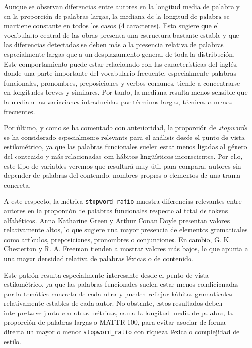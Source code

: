 \documentclass[IB]{TFUOC}%
\begin{document}
Aunque se observan diferencias entre autores en la longitud media de palabra y en la proporción de palabras largas, la mediana de la longitud de palabra se mantiene constante en todos los casos (4 caracteres). Esto sugiere que el vocabulario central de las obras presenta una estructura bastante estable y que las diferencias detectadas se deben más a la presencia relativa de palabras especialmente largas que a un desplazamiento general de toda la distribución. Este comportamiento puede estar relacionado con las características del inglés, donde una parte importante del vocabulario frecuente, especialmente palabras funcionales, pronombres, preposiciones y verbos comunes, tiende a concentrarse en longitudes breves y similares. Por tanto, la mediana resulta menos sensible que la media a las variaciones introducidas por términos largos, técnicos o menos frecuentes.

Por último, y como se ha comentado con anterioridad, la proporción de \textit{stopwords} se ha considerado especialmente relevante para el análisis desde el punto de vista estilométrico, ya que las palabras funcionales suelen estar menos ligadas al género del contenido y más relacionadas con hábitos lingüísticos inconscientes. Por ello, este tipo de variables veremos que resultará muy útil para comparar autores sin depender de palabras del contenido, nombres propios o elementos de una trama concreta.

A este respecto, la métrica \texttt{stopword\_ratio} muestra diferencias relevantes entre autores en la proporción de palabras funcionales respecto al total de tokens alfabéticos. Anna Katharine Green y Arthur Conan Doyle presentan valores relativamente altos, lo que sugiere una mayor presencia de elementos gramaticales como artículos, preposiciones, pronombres o conjunciones. En cambio, G. K. Chesterton y R. A. Freeman tienden a mostrar valores más bajos, lo que apunta a una mayor densidad relativa de palabras léxicas o de contenido.

Este patrón resulta especialmente interesante desde el punto de vista estilométrico, ya que las palabras funcionales suelen estar menos condicionadas por la temática concreta de cada obra y pueden reflejar hábitos gramaticales relativamente estables de cada autor. No obstante, estos resultados deben interpretarse junto con otras métricas, como la longitud media de palabra, la proporción de palabras largas o MATTR-100, para evitar asociar de forma directa un mayor o menor \texttt{stopword\_ratio} con riqueza léxica o complejidad de estilo.
\end{document}
